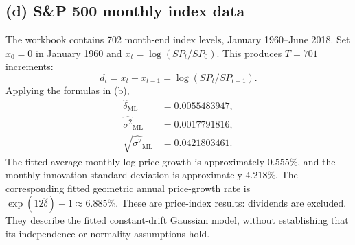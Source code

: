 \clearpage
\subsection*{(d) S\&P 500 monthly index data}
The workbook contains 702 month-end index levels, January 1960--June 2018.
Set $x_0=0$ in January 1960 and
$x_t=\log(SP_t/SP_0)$. This produces $T=701$ increments:
\[
d_t=x_t-x_{t-1}=\log(SP_t/SP_{t-1}).
\]
Applying the formulas in (b),
\[
\boxed{\begin{aligned}\widehat\delta_{\mathrm{ML}}&=0.0055483947,\\
\widehat{\sigma^2}_{\mathrm{ML}}&=0.0017791816,\\
\sqrt{\widehat{\sigma^2}_{\mathrm{ML}}}&=0.0421803461.\end{aligned}}
\]
The fitted average monthly log price growth is approximately $0.555\%$,
and the monthly innovation standard deviation is approximately $4.218\%$.
The corresponding fitted geometric annual price-growth rate is
$\exp(12\widehat\delta)-1\approx6.885\%$.
These are price-index results: dividends are excluded.
They describe the fitted constant-drift Gaussian model, without
establishing that its independence or normality assumptions hold.
